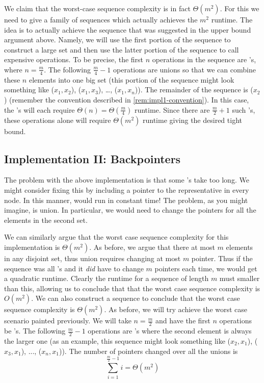 We claim that the worst-case sequence complexity is in fact $\Theta(m^2)$. For this we need to give a family of sequences which actually achieves the $m^2$ runtime. The idea is to actually achieve the sequence that was suggested in the upper bound argument above. Namely, we will use the first portion of the sequence to construct a large set and then use the latter portion of the sequence to call expensive  operations. To be precise, the first $n$ operations in the sequence are 's, where $n = \frac{m}{4}$. The following $\frac{m}{4} - 1$ operations are unions so that we can combine these $n$ elements into one big set (this portion of the sequence might look something like ($x_1, x_2$), ($x_1, x_3$), \dots, ($x_1, x_n$)). The remainder of the sequence is ($x_2$) (remember the convention described in \autoref{rem:impl1-convention}). In this case, the 's will each require $\Theta(n) = \Theta(\frac{m}{4})$ runtime. Since there are $\frac{m}{2} + 1$ such 's, these operations alone will require $\Theta(m^2)$ runtime giving the desired tight bound.

\subsection{Implementation II: Backpointers}


The problem with the above implementation is that some 's take too long. We might consider fixing this by including a pointer to the representative in every node. In this manner,  would run in constant time! The problem, as you might imagine, is union. In particular, we would need to change the pointers for all the elements in the second set. 

We can similarly argue that the worst case sequence complexity for this implementation is $\Theta(m^2)$. As before, we argue that there at most $m$ elements in any disjoint set, thus union requires changing at most $m$ pointer. Thus if the sequence was all 's and it \textit{did} have to change $m$ pointers each time, we would get a quadratic runtime. Clearly the runtime for a sequence of length $m$ must smaller than this, allowing us to conclude that that the worst case sequence complexity is $O(m^2)$. We can also construct a sequence to conclude that the worst case sequence complexity is $\Theta(m^2)$. As before, we will try achieve the worst case scenario painted previously. We will take $n = \frac{m}{2}$ and have the first $n$ operations be 's. The following $\frac{m}{2} - 1$ operations are 's where the second element is always the larger one (as an example, this sequence might look something like ($x_2, x_1$), ($x_3, x_1$), ..., ($x_n, x_1$)). The number of pointers changed over all the unions is 
$$ \sum_{i = 1}^{\frac{m}{2} - 1} i = \Theta(m^2) $$

